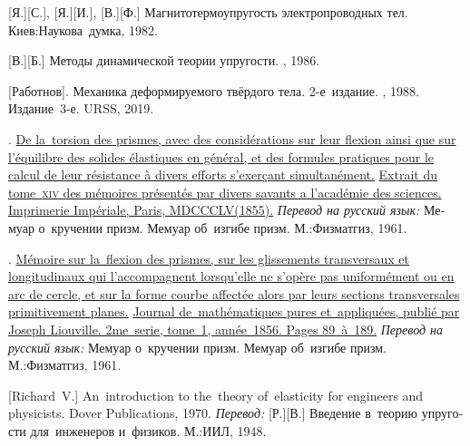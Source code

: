\begin{thebibliography}{123}
\begin{otherlanguage}{russian}
[Я.][С.], [Я.][И.], [В.][Ф.]
Магнито\-термо\-упру\-гость электропроводных тел.
Киев:\;Наукова~думка, 1982.

[В.][Б.] Методы динамической теории упругости. \naukapublisher, 1986.

[Работнов].
Механика деформируемого твёрдого тела.
2\hbox{-}е~издание. \naukapublisher, 1988.
Издание~3\hbox{-}е. URSS, 2019.

.
%
\href{https://gallica.bnf.fr/ark:/12148/bpt6k99739z/}{De la~torsion des prismes, avec des considérations sur leur flexion ainsi que sur l’équilibre des solides élastiques en général, et des formules pratiques pour le calcul de leur résistance à divers efforts s’exerçant simultanément.}
%
\href{https://gallica.bnf.fr/ark:/12148/bpt6k99739z/}{Extrait du tome~\textsc{xiv} des mémoires présentés par divers savants a l’académie des sciences.
Imprimerie Impériale, Paris, M\:DCCC\:LV\:(1855).}
\emph{Перевод на русский язык:}
Мемуар о~кручении призм.
Мемуар об~изгибе призм.
М.:\;Физ\-мат\-гиз, 1961.

.
%
\href{http://www.numdam.org/item/JMPA_1856_2_1__89_0.pdf}{Mémoire sur la~flexion des prismes, sur les glissements transversaux et longitudinaux qui l’accompagnent lorsqu’elle ne s’opère pas uniformément ou en arc de cercle, et sur la forme courbe affectée alors par leurs sections transversales primitivement planes.}
%
\href{http://www.numdam.org/item/JMPA_1856_2_1__89_0.pdf}{Journal de~mathématiques pures et~appliquées, publié par Joseph Liouville.
2me~serie, tome~1, année~1856.
Pages 89~à~189.}
%
\emph{Перевод на русский язык:}
Мемуар о~кручении призм.
Мемуар об~изгибе призм.
М.:\;Физ\-мат\-гиз, 1961.

[Richard~V.]
An~introduction to the~theory of~elasticity for engineers and physicists.
Dover Publications, 1970.
\emph{Перевод:}
[Р.][В.]
Введение в~теорию упругости для~инженеров и~физиков.
М.:\;ИИЛ, 1948.


\end{otherlanguage}
\end{thebibliography}
